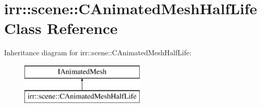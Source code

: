 \hypertarget{classirr_1_1scene_1_1_c_animated_mesh_half_life}{\section{irr\-:\-:scene\-:\-:C\-Animated\-Mesh\-Half\-Life Class Reference}
\label{classirr_1_1scene_1_1_c_animated_mesh_half_life}
}
Inheritance diagram for irr\-:\-:scene\-:\-:C\-Animated\-Mesh\-Half\-Life\-:\begin{figure}[H]
\begin{center}
\leavevmode
\includegraphics[height=2.000000cm]{classirr_1_1scene_1_1_c_animated_mesh_half_life}
\end{center}
\end{figure}
